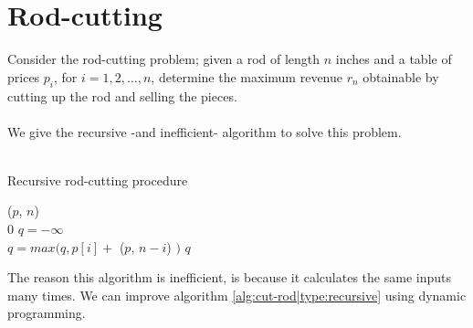 \section{Rod-cutting}
Consider the rod-cutting problem; given a rod of length $n$ inches and a table
of prices $p_i$, for $i = 1, 2, \dots, n$, determine the maximum revenue $r_n$
obtainable by cutting up the rod and selling the pieces.
\\\\
We give the recursive -and inefficient- algorithm to solve this problem. \\\\
\begin{algorithm}[H]
	\caption{Recursive rod-cutting procedure}
	\label{alg:cut-rod|type:recursive}
	
	
	
	
	\BlankLine
	\CutRod($p$, $n$) \\
	\Begin
	{
		{
			\Return $0$
		}
		$q = -\infty$ \\
		{
			$q = max(q, p[i] + $ \CutRod($p$, $n-i$) $)$
		}
		\Return $q$
	}
\end{algorithm}
The reason this algorithm is inefficient, is because it calculates the same
inputs many times. We can improve algorithm \ref{alg:cut-rod|type:recursive}
using dynamic programming.

\newpage
